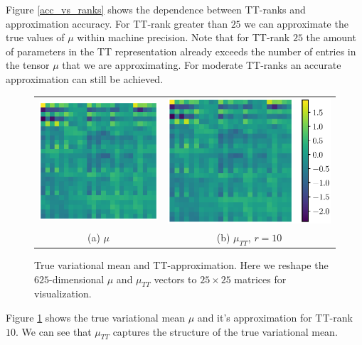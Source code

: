 Figure \ref{acc_vs_ranks} shows the dependence between TT-ranks and 
approximation accuracy. For TT-rank greater than $25$ we can approximate the
true values of $\mu$ within machine precision. Note that for TT-rank $25$ the
amount of parameters in the TT representation already exceeds the number of
entries in the tensor $\mu$ that we are approximating. For moderate
TT-ranks an accurate approximation can still be achieved.

\begin{figure}[!h]
  \begin{center}
      \begin{tabular}{cc}
          \includegraphics[trim = 100 0 60 0, clip, height=0.4\linewidth]{pics/true.eps} &
        \hspace{0.5cm}\includegraphics[trim = 100 0 0 0, clip, height=0.4\linewidth]{pics/tt.eps} \\
          (a) $\mu$ &
          (b) $\mu_{TT}$, $r = 10$
      \end{tabular}
  \end{center}
  \caption{True variational mean and TT-approximation. Here we reshape the 
    $625$-dimensional $\mu$ and $\mu_{TT}$ vectors
    to $25 \times 25$ matrices for visualization.}
  \label{true_and_tt}
\end{figure}

Figure \ref{true_and_tt} shows the true variational mean $\mu$ and it's 
approximation for TT-rank $10$.  We can see that $\mu_{TT}$ captures the 
structure of the true variational mean.

